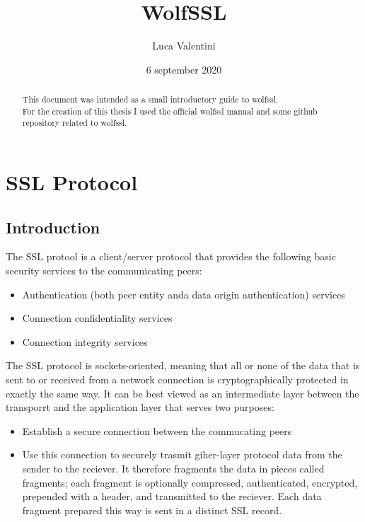 \documentclass[a4paper,12pt]{report}
\title{WolfSSL}
\author{Luca Valentini}
\date{6 september 2020}
\begin{document}
\maketitle
\tableofcontents



\newpage
\begin{abstract}
This document was intended as a small introductory guide to wolfssl.
\\For the creation of this thesis I used the official wolfssl manual and some github repository related to wolfssl.
\end{abstract}


\chapter{SSL Protocol}

\section{Introduction}
The SSL protool is a client/server protocol that provides the following basic security services to the communicating peers:
\begin{itemize}
	\item Authentication (both peer entity anda data origin authentication) services
	\item Connection confidentiality services
	\item Connection integrity services
\end{itemize}

The SSL protocol is sockets-oriented, meaning that all or none of the data that is sent to or received from a network connection is cryptographically protected in exactly the same way. It can be best viewed as an intermediate layer between the transporrt and the application layer that serves two purposes:
\begin{itemize}
	\item Establish a secure connection between the commucating peers
	\item Use this connection to securely trasmit giher-layer protocol data from the sender to the reciever. It therefore fragments the data in pieces called fragments; each fragment is optionally compressed, authenticated, encrypted, prepended with a header, and transmitted to the reciever. Each data fragment prepared this way is sent in a distinct SSL record.
\end{itemize}
\end{document}
